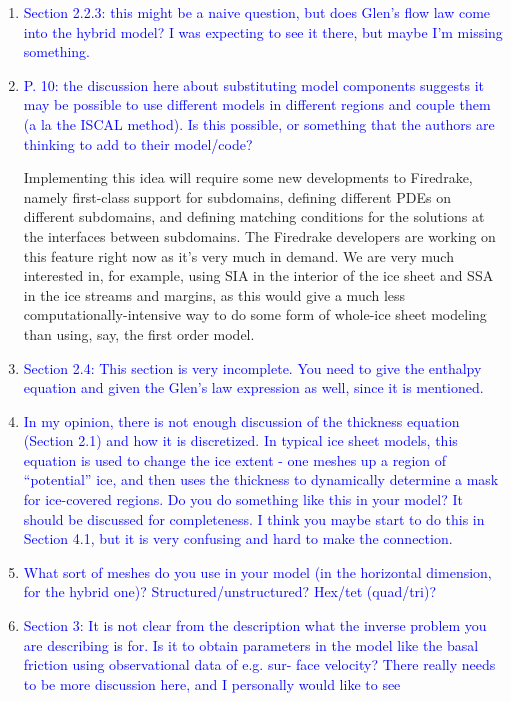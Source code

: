 \documentclass{article}
\theoremstyle{definition}
\theoremstyle{plain}
\begin{document}
\begin{enumerate}
{in the hybrid approach. What order is typically used?}
\item \textcolor{blue}{Section 2.2.3: this might be a naive question, but does Glen’s flow law come into the hybrid model?
I was expecting to see it there, but maybe I’m missing something.}
\item \textcolor{blue}{P. 10: the discussion here about substituting model components suggests it may be possible to use
different models in different regions and couple them (a la the ISCAL method). Is this possible, or
something that the authors are thinking to add to their model/code?}

Implementing this idea will require some new developments to Firedrake, namely first-class support for subdomains, defining different PDEs on different subdomains, and defining matching conditions for the solutions at the interfaces between subdomains.
The Firedrake developers are working on this feature right now as it's very much in demand.
We are very much interested in, for example, using SIA in the interior of the ice sheet and SSA in the ice streams and margins, as this would give a much less computationally-intensive way to do some form of whole-ice sheet modeling than using, say, the first order model.
\item \textcolor{blue}{Section 2.4: This section is very incomplete. You need to give the enthalpy equation and given the
Glen’s law expression as well, since it is mentioned.}
\item \textcolor{blue}{In my opinion, there is not enough discussion of the thickness equation (Section 2.1) and how it
is discretized. In typical ice sheet models, this equation is used to change the ice extent - one
meshes up a region of “potential” ice, and then uses the thickness to dynamically determine a mask
for ice-covered regions. Do you do something like this in your model? It should be discussed for
completeness. I think you maybe start to do this in Section 4.1, but it is very confusing and hard to
make the connection.}
\item \textcolor{blue}{What sort of meshes do you use in your model (in the horizontal dimension, for the hybrid one)?
Structured/unstructured? Hex/tet (quad/tri)?}
\item \textcolor{blue}{Section 3: It is not clear from the description what the inverse problem you are describing is for.
Is it to obtain parameters in the model like the basal friction using observational data of e.g. sur-
face velocity? There really needs to be more discussion here, and I personally would like to see
}
\end{enumerate}
\end{document}
